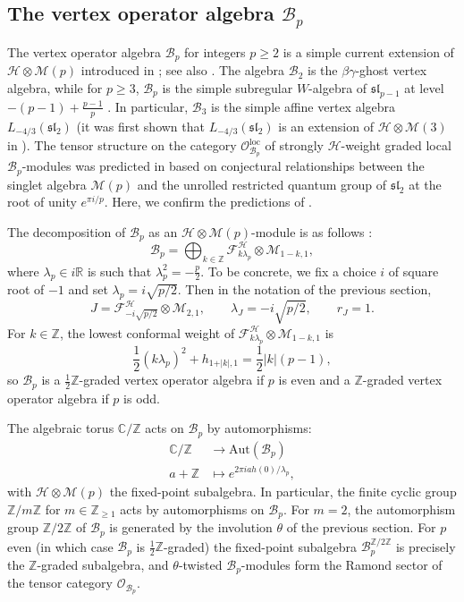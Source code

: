 \documentclass[11pt, reqno]{amsart}
\theoremstyle{definition}\newtheorem{defi}[thm]{Definition}
\theoremstyle{definition}\newtheorem{rem}[thm]{Remark}
\theoremstyle{definition}\newtheorem{exam}[thm]{Example}
\theoremstyle{definition}\newtheorem{assum}[thm]{Assumption}
\newcommand{\cB}{\mathcal{B}}
\newcommand{\cH}{\mathcal{H}}
\newcommand{\cM}{\mathcal{M}}
\newcommand{\cF}{\mathcal{F}}
\newcommand{\cO}{\mathcal{O}}
\newcommand{\CC}{\mathbb{C}}
\newcommand{\ZZ}{\mathbb{Z}}
\newcommand{\Oloc}{\cO^{\mathrm{loc}}}
\begin{document}
\subsection{The vertex operator algebra \texorpdfstring{$\mathcal B_p$}{Bp}}

The vertex operator algebra $\mathcal{B}_p$ for integers $p\geq 2$ is a simple current extension of $\cH \otimes \cM(p)$ introduced in \cite{CRW}; see also  \cite{Cr}. The algebra $\cB_2$ is the $\beta\gamma$-ghost vertex algebra, while for $p\geq 3$, $\cB_p$ is the simple subregular $W$-algebra of $\mathfrak{sl}_{p-1}$ at level $-(p-1)+\frac{p-1}{p}$ \cite{ACGY}. In particular, $\cB_3$ is the simple affine vertex algebra $L_{-4/3}(\mathfrak{sl}_2)$ (it was first shown that $L_{-4/3}(\mathfrak{sl}_2)$ is an extension of $\cH\otimes\cM(3)$ in \cite{Ad_sl2_-4/3}). The tensor structure on the category $\Oloc_{\cB_p}$ of strongly $\cH$-weight graded local $\cB_p$-modules was predicted in \cite{ACKR} based on conjectural relationships between the singlet algebra $\cM(p)$ and the unrolled restricted quantum group of $\mathfrak{sl}_2$ at the root of unity $e^{\pi i/p}$. Here, we confirm the predictions of \cite{ACKR}.


The decomposition of $\cB_p$ as an $\cH\otimes\cM(p)$-module is as follows \cite{CRW, ACKR}:
\begin{equation}\label{eqn:Bp_decomp}
\mathcal{B}_p = \bigoplus_{k \in \ZZ} \cF_{k\lambda_p}^\cH \otimes \cM_{1-k,1},
\end{equation}
where $\lambda_p \in i\mathbb{R}$ is such that $\lambda_p^2 = -\frac{p}{2}$. To be concrete, we fix a choice $i$ of square root of $-1$ and set $\lambda_p=i\sqrt{p/2}$. Then in the notation of the previous section, 
\begin{equation*}
J=\cF^\cH_{-i\sqrt{p/2}}\otimes\cM_{2,1},\qquad \lambda_J=-i\sqrt{p/2},\qquad r_J=1.
\end{equation*}
For $k\in\ZZ$, the lowest conformal weight of $\cF_{k\lambda_p}^\cH\otimes\cM_{1-k,1}$ is
\begin{equation*}
\frac{1}{2}(k\lambda_p)^2+h_{1+\vert k\vert,1} =\frac{1}{2}\vert k\vert(p-1),
\end{equation*}
so $\cB_p$ is a $\frac{1}{2}\ZZ$-graded vertex operator algebra if $p$ is even and a $\ZZ$-graded vertex operator algebra if $p$ is odd.


The algebraic torus $\CC/\ZZ$ acts on $\cB_p$ by automorphisms:
\begin{align*}
\CC/\ZZ & \rightarrow \mathrm{Aut}(\cB_p)\\
a+\ZZ & \mapsto e^{2\pi i ah(0)/\lambda_p},
\end{align*}
with $\cH\otimes\cM(p)$ the fixed-point subalgebra. In particular, the finite cyclic group $\ZZ/m\ZZ$ for $m\in\ZZ_{\geq 1}$ acts by automorphisms on $\cB_p$. For $m=2$, the automorphism group $\ZZ/2\ZZ$ of $\cB_p$ is generated by the involution $\theta$ of the previous section. For $p$ even (in which case $\cB_p$ is $\frac{1}{2}\ZZ$-graded) the fixed-point subalgebra $\cB_p^{\ZZ/2\ZZ}$ is precisely the $\ZZ$-graded subalgebra, and $\theta$-twisted $\cB_p$-modules form the Ramond sector of the tensor category $\cO_{\cB_p}$.
\end{document}
